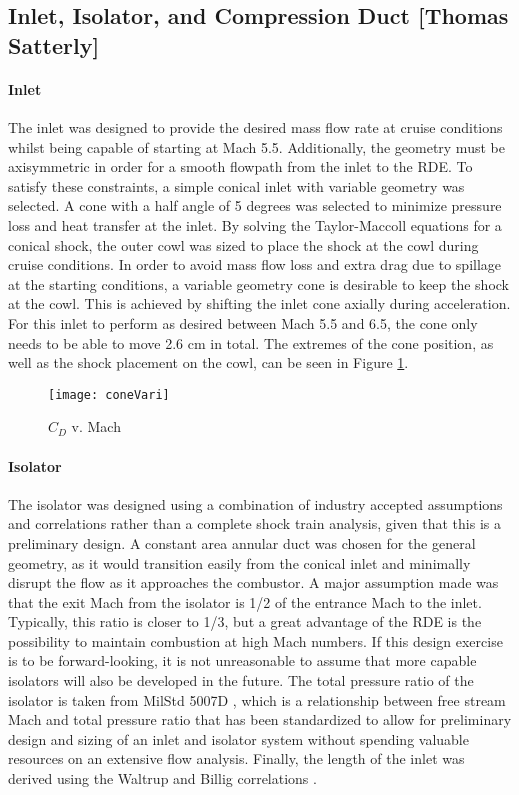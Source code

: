 \subsection{Inlet, Isolator, and Compression Duct [Thomas Satterly]}
\paragraph{Inlet}

The inlet was designed to provide the desired mass flow rate at cruise conditions whilst being capable of starting at Mach 5.5. Additionally, the geometry must be axisymmetric in order for a smooth flowpath from the inlet to the RDE. To satisfy these constraints, a simple conical inlet with variable geometry was selected. 
A cone with a half angle of 5 degrees was selected to minimize pressure loss and heat transfer at the inlet. By solving the Taylor-Maccoll equations for a conical shock, the outer cowl was sized to place the shock at the cowl during cruise conditions. In order to avoid mass flow loss and extra drag due to spillage at the starting conditions, a variable geometry cone is desirable to keep the shock at the cowl. This is achieved by shifting the inlet cone axially during acceleration. For this inlet to perform as desired between Mach 5.5 and 6.5, the cone only needs to be able to move 2.6 cm in total. The extremes of the cone position, as well as the shock placement on the cowl, can be seen in Figure \ref{fig:coneVari}.

\begin{figure}[H]
\begin{center}
\texttt{[image: coneVari]}
\caption{$C_D$ v. Mach}
\label{fig:coneVari}
\end{center}
\end{figure}

\paragraph{Isolator}

    The isolator was designed using a combination of industry accepted assumptions and correlations rather than a complete shock train analysis, given that this is a preliminary design. A constant area annular duct was chosen for the general geometry, as it would transition easily from the conical inlet and minimally disrupt the flow as it approaches the combustor. 
A major assumption made was that the exit Mach from the isolator is 1/2 of the entrance Mach to the inlet. Typically, this ratio is closer to 1/3, but a great advantage of the RDE is the possibility to maintain combustion at high Mach numbers. If this design exercise is to be forward-looking, it is not unreasonable to assume that more capable isolators will also be developed in the future. 
    The total pressure ratio of the isolator is taken from MilStd 5007D \cite{milstd5007D}, which is a relationship between free stream Mach and total pressure ratio that has been standardized to allow for preliminary design and sizing of an inlet and isolator system without spending valuable resources on an extensive flow analysis. Finally, the length of the inlet was derived using the Waltrup and Billig correlations \cite{waltrup}.


